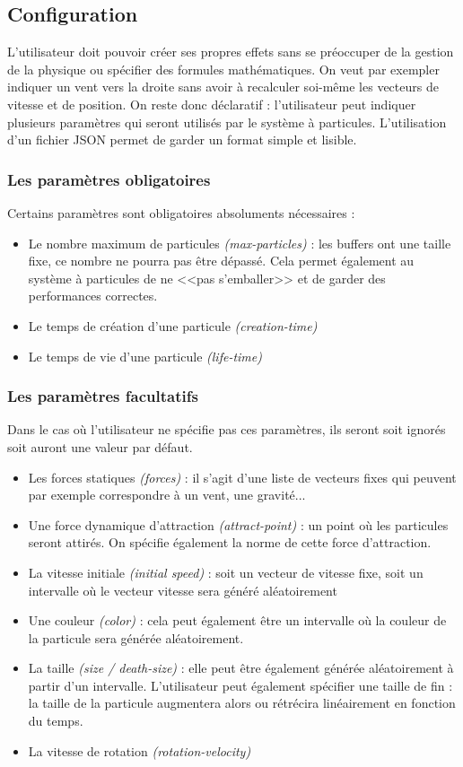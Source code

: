 \documentclass[a4paper,10pt]{article}
\begin{document}
\subsection{Configuration}
L'utilisateur doit pouvoir créer ses propres effets sans se préoccuper de la gestion de la physique ou spécifier des formules mathématiques.
On veut par exempler indiquer un vent vers la droite sans avoir à recalculer soi-même les vecteurs de vitesse et de position.
On reste donc déclaratif : l'utilisateur peut indiquer plusieurs paramètres qui seront utilisés par le système à particules.
L'utilisation d'un fichier JSON permet de garder un format simple et lisible.
\subsubsection{Les paramètres obligatoires}
Certains paramètres sont obligatoires absoluments nécessaires :
\begin{itemize}
 \item Le nombre maximum de particules \emph{(max-particles)} : les buffers ont une taille fixe, ce nombre ne pourra pas être dépassé.
 Cela permet également au système à particules de ne <<pas s'emballer>> et de garder des performances correctes.
 \item Le temps de création d'une particule \emph{(creation-time)}
 \item Le temps de vie d'une particule \emph{(life-time)}
\end{itemize}


\subsubsection{Les paramètres facultatifs}
Dans le cas où l'utilisateur ne spécifie pas ces paramètres, ils seront soit ignorés soit auront une valeur par défaut.
\begin{itemize}
 \item Les forces statiques \emph{(forces)} : il s'agit d'une liste de vecteurs fixes qui peuvent par exemple correspondre à un vent, une gravité...
 \item Une force dynamique d'attraction \emph{(attract-point)} : un point où les particules seront attirés. On spécifie également la norme de cette force d'attraction.
 \item La vitesse initiale \emph{(initial speed)} : soit un vecteur de vitesse fixe, soit un intervalle où le vecteur vitesse sera généré aléatoirement
 \item Une couleur \emph{(color)} : cela peut également être un intervalle où la couleur de la particule sera générée aléatoirement.
 \item La taille \emph{(size / death-size)} : elle peut être également générée aléatoirement à partir d'un intervalle.
 L'utilisateur peut également spécifier une taille de fin : la taille de la particule augmentera alors ou rétrécira linéairement en fonction du temps.
 \item La vitesse de rotation \emph{(rotation-velocity)}
\end{itemize}
\end{document}
